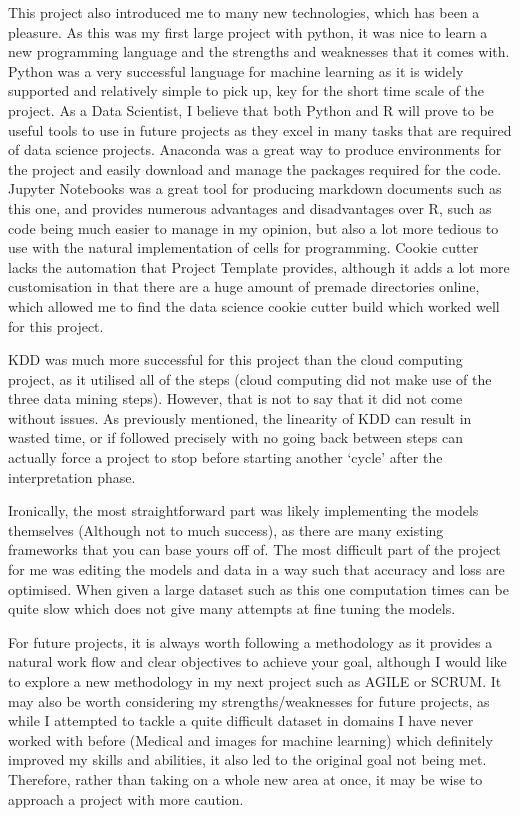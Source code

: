 \documentclass[11pt]{article}
\begin{document}
This project also introduced me to many new technologies, which has been
a pleasure. As this was my first large project with python, it was nice
to learn a new programming language and the strengths and weaknesses
that it comes with. Python was a very successful language for machine
learning as it is widely supported and relatively simple to pick up, key
for the short time scale of the project. As a Data Scientist, I believe
that both Python and R will prove to be useful tools to use in future
projects as they excel in many tasks that are required of data science
projects. Anaconda was a great way to produce environments for the
project and easily download and manage the packages required for the
code. Jupyter Notebooks was a great tool for producing markdown
documents such as this one, and provides numerous advantages and
disadvantages over R, such as code being much easier to manage in my
opinion, but also a lot more tedious to use with the natural
implementation of cells for programming. Cookie cutter lacks the
automation that Project Template provides, although it adds a lot more
customisation in that there are a huge amount of premade directories
online, which allowed me to find the data science cookie cutter build
which worked well for this project.

KDD was much more successful for this project than the cloud computing
project, as it utilised all of the steps (cloud computing did not make
use of the three data mining steps). However, that is not to say that it
did not come without issues. As previously mentioned, the linearity of
KDD can result in wasted time, or if followed precisely with no going
back between steps can actually force a project to stop before starting
another `cycle' after the interpretation phase.

Ironically, the most straightforward part was likely implementing the
models themselves (Although not to much success), as there are many
existing frameworks that you can base yours off of. The most difficult
part of the project for me was editing the models and data in a way such
that accuracy and loss are optimised. When given a large dataset such as
this one computation times can be quite slow which does not give many
attempts at fine tuning the models.

For future projects, it is always worth following a methodology as it
provides a natural work flow and clear objectives to achieve your goal,
although I would like to explore a new methodology in my next project
such as AGILE or SCRUM. It may also be worth considering my
strengths/weaknesses for future projects, as while I attempted to tackle
a quite difficult dataset in domains I have never worked with before
(Medical and images for machine learning) which definitely improved my
skills and abilities, it also led to the original goal not being met.
Therefore, rather than taking on a whole new area at once, it may be
wise to approach a project with more caution.
\end{document}
